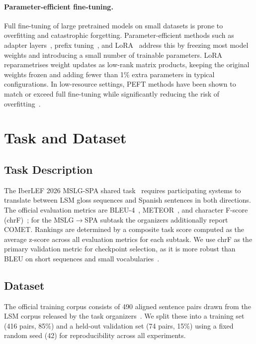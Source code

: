 \documentclass[sigconf,screen]{ceurart}
\begin{document}
\paragraph{Parameter-efficient fine-tuning.}
Full fine-tuning of large pretrained models on small datasets is prone
to overfitting and catastrophic forgetting.
Parameter-efficient methods such as adapter layers~\cite{houlsby2019adapters},
prefix tuning~\cite{li2021prefix}, and LoRA~\cite{hu2022lora} address
this by freezing most model weights and introducing a small number of
trainable parameters.
LoRA reparametrises weight updates as low-rank matrix products, keeping
the original weights frozen and adding fewer than 1\% extra parameters
in typical configurations.
In low-resource settings, PEFT methods have been shown to match or
exceed full fine-tuning while significantly reducing the risk of
overfitting~\cite{hu2022lora}.

\section{Task and Dataset}
\label{sec:task}

\subsection{Task Description}

The IberLEF 2026 MSLG-SPA shared task~\cite{rodriguez2026overview,iberlef2026overview} requires
participating systems to translate between LSM gloss sequences and
Spanish sentences in both directions.
The official evaluation metrics are BLEU-4~\cite{papineni2002bleu},
METEOR~\cite{banerjee2005meteor}, and character F-score
(chrF)~\cite{popovic2015chrf}; for the MSLG$\!\to\!$SPA subtask
the organizers additionally report COMET.
Rankings are determined by a composite task score computed as the
average z-score across all evaluation metrics for each subtask.
We use chrF as the primary validation metric for checkpoint selection,
as it is more robust than BLEU on short sequences and
small vocabularies~\cite{popovic2015chrf}.

\subsection{Dataset}

The official training corpus consists of 490 aligned sentence pairs
drawn from the LSM corpus released by the task organizers~\cite{rodriguez2026overview}.
We split these into a training set (416 pairs, 85\%) and a held-out
validation set (74 pairs, 15\%) using a fixed random seed (42) for
reproducibility across all experiments.
\end{document}
